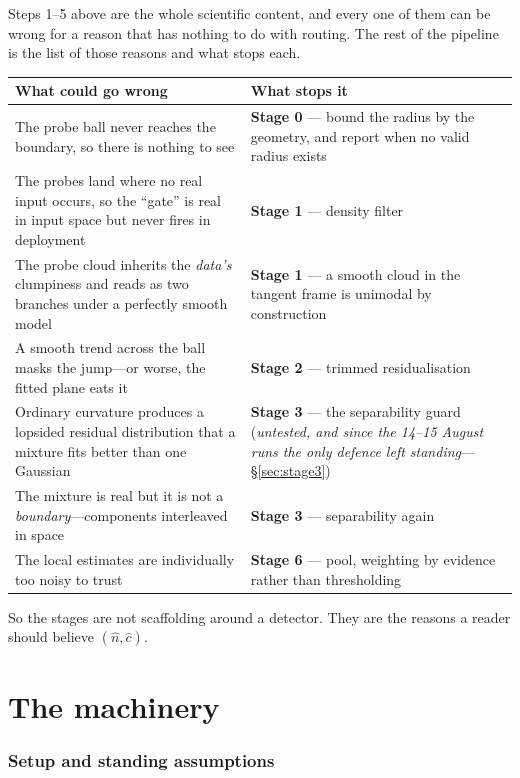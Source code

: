 \documentclass[11pt]{article}
\newcommand{\nhat}{\hat{n}}
\newcommand{\chat}{\hat{c}}
\begin{document}
Steps 1--5 above are the whole scientific content, and every one of them can be wrong for a
reason that has nothing to do with routing. The rest of the pipeline is the list of those
reasons and what stops each.

\begin{table}[h]
\small
\begin{tabular}{@{}p{}p{}@{}}
\toprule
\textbf{\sffamily What could go wrong} & \textbf{\sffamily What stops it}\\
\midrule
The probe ball never reaches the boundary, so there is nothing to see
  & \textbf{Stage 0} --- bound the radius by the geometry, and report when no valid radius exists\\
The probes land where no real input occurs, so the ``gate'' is real in input space but never
fires in deployment
  & \textbf{Stage 1} --- density filter\\
The probe cloud inherits the \emph{data's} clumpiness and reads as two branches under a
perfectly smooth model
  & \textbf{Stage 1} --- a smooth cloud in the tangent frame is unimodal by construction\\
A smooth trend across the ball masks the jump---or worse, the fitted plane eats it
  & \textbf{Stage 2} --- trimmed residualisation\\
Ordinary curvature produces a lopsided residual distribution that a mixture fits better than one
Gaussian
  & \textbf{Stage 3} --- the separability guard (\emph{untested, and since the 14--15 August
    runs the only defence left standing}---\S\ref{sec:stage3})\\
The mixture is real but it is not a \emph{boundary}---components interleaved in space
  & \textbf{Stage 3} --- separability again\\
The local estimates are individually too noisy to trust
  & \textbf{Stage 6} --- pool, weighting by evidence rather than thresholding\\
\bottomrule
\end{tabular}
\end{table}

\noindent So the stages are not scaffolding around a detector. They are the reasons a reader
should believe $(\nhat,\chat)$.

\part{The machinery}

\section{Setup and standing assumptions}
\label{sec:setup}
\end{document}
